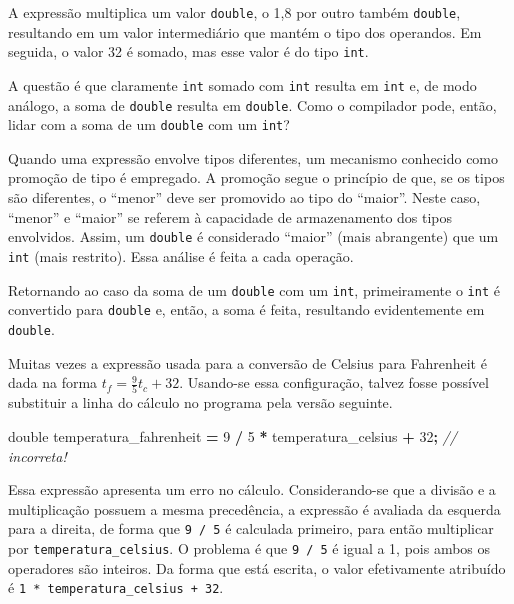 \documentclass[
  11pt,
  a4paper,
]{scrbook}
\newenvironment{Shaded}{\begin{snugshade}}{\end{snugshade}}
\newcommand{\CommentTok}[1]{\textcolor[rgb]{0.56,0.35,0.01}{\textit{#1}}}
\newcommand{\DataTypeTok}[1]{\textcolor[rgb]{0.13,0.29,0.53}{#1}}
\newcommand{\DecValTok}[1]{\textcolor[rgb]{0.00,0.00,0.81}{#1}}
\newcommand{\NormalTok}[1]{#1}
\newcommand{\OperatorTok}[1]{\textcolor[rgb]{0.81,0.36,0.00}{\textbf{#1}}}
\begin{document}
A expressão multiplica um valor \texttt{double}, o 1,8 por outro também
\texttt{double}, resultando em um valor intermediário que mantém o tipo
dos operandos. Em seguida, o valor 32 é somado, mas esse valor é do tipo
\texttt{int}.

A questão é que claramente \texttt{int} somado com \texttt{int} resulta
em \texttt{int} e, de modo análogo, a soma de \texttt{double} resulta em
\texttt{double}. Como o compilador pode, então, lidar com a soma de um
\texttt{double} com um \texttt{int}?

Quando uma expressão envolve tipos diferentes, um mecanismo conhecido
como promoção de tipo é empregado. A promoção segue o princípio de que,
se os tipos são diferentes, o ``menor'' deve ser promovido ao tipo do
``maior''. Neste caso, ``menor'' e ``maior'' se referem à capacidade de
armazenamento dos tipos envolvidos. Assim, um \texttt{double} é
considerado ``maior'' (mais abrangente) que um \texttt{int} (mais
restrito). Essa análise é feita a cada operação.

Retornando ao caso da soma de um \texttt{double} com um \texttt{int},
primeiramente o \texttt{int} é convertido para \texttt{double} e, então,
a soma é feita, resultando evidentemente em \texttt{double}.

Muitas vezes a expressão usada para a conversão de Celsius para
Fahrenheit é dada na forma \({t_f = \frac{9}{5}t_c + 32}\). Usando-se
essa configuração, talvez fosse possível substituir a linha do cálculo
no programa pela versão seguinte.

\begin{Shaded}
\begin{Highlighting}[]
\DataTypeTok{double}\NormalTok{ temperatura\_fahrenheit }\OperatorTok{=} \DecValTok{9} \OperatorTok{/} \DecValTok{5} \OperatorTok{*}\NormalTok{ temperatura\_celsius }\OperatorTok{+} \DecValTok{32}\OperatorTok{;}  \CommentTok{// incorreta!}
\end{Highlighting}
\end{Shaded}

Essa expressão apresenta um erro no cálculo. Considerando-se que a
divisão e a multiplicação possuem a mesma precedência, a expressão é
avaliada da esquerda para a direita, de forma que \texttt{9\ /\ 5} é
calculada primeiro, para então multiplicar por
\texttt{temperatura\_celsius}. O problema é que \texttt{9\ /\ 5} é igual
a 1, pois ambos os operadores são inteiros. Da forma que está escrita, o
valor efetivamente atribuído é
\texttt{1\ *\ temperatura\_celsius\ +\ 32}.
\end{document}
